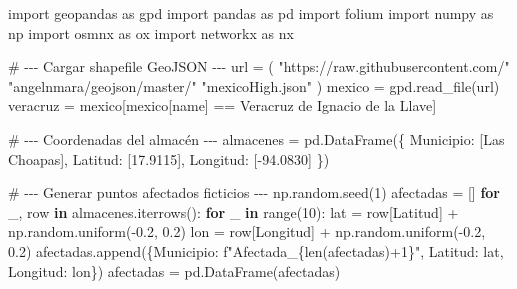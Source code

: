 \documentclass[
  spanish,
  us-letterpaper,
  DIV=11,
  numbers=noendperiod]{scrreprt}
\newenvironment{Shaded}{\begin{snugshade}}{\end{snugshade}}
\newcommand{\BuiltInTok}[1]{\textcolor[rgb]{0.00,0.23,0.31}{#1}}
\newcommand{\CommentTok}[1]{\textcolor[rgb]{0.37,0.37,0.37}{#1}}
\newcommand{\ControlFlowTok}[1]{\textcolor[rgb]{0.00,0.23,0.31}{\textbf{#1}}}
\newcommand{\DecValTok}[1]{\textcolor[rgb]{0.68,0.00,0.00}{#1}}
\newcommand{\FloatTok}[1]{\textcolor[rgb]{0.68,0.00,0.00}{#1}}
\newcommand{\ImportTok}[1]{\textcolor[rgb]{0.00,0.46,0.62}{#1}}
\newcommand{\KeywordTok}[1]{\textcolor[rgb]{0.00,0.23,0.31}{\textbf{#1}}}
\newcommand{\NormalTok}[1]{\textcolor[rgb]{0.00,0.23,0.31}{#1}}
\newcommand{\OperatorTok}[1]{\textcolor[rgb]{0.37,0.37,0.37}{#1}}
\newcommand{\SpecialCharTok}[1]{\textcolor[rgb]{0.37,0.37,0.37}{#1}}
\newcommand{\SpecialStringTok}[1]{\textcolor[rgb]{0.13,0.47,0.30}{#1}}
\newcommand{\StringTok}[1]{\textcolor[rgb]{0.13,0.47,0.30}{#1}}
\numberwithin{equation}{section}
\begin{document}
\begin{Shaded}
\begin{Highlighting}[]
\ImportTok{import}\NormalTok{ geopandas }\ImportTok{as}\NormalTok{ gpd}
\ImportTok{import}\NormalTok{ pandas }\ImportTok{as}\NormalTok{ pd}
\ImportTok{import}\NormalTok{ folium}
\ImportTok{import}\NormalTok{ numpy }\ImportTok{as}\NormalTok{ np}
\ImportTok{import}\NormalTok{ osmnx }\ImportTok{as}\NormalTok{ ox}
\ImportTok{import}\NormalTok{ networkx }\ImportTok{as}\NormalTok{ nx}

\CommentTok{\# {-}{-}{-} Cargar shapefile GeoJSON {-}{-}{-}}
\NormalTok{url }\OperatorTok{=}\NormalTok{ (}
    \StringTok{"https://raw.githubusercontent.com/"}
    \StringTok{"angelnmara/geojson/master/"}
    \StringTok{"mexicoHigh.json"}
\NormalTok{)}
\NormalTok{mexico }\OperatorTok{=}\NormalTok{ gpd.read\_file(url)}
\NormalTok{veracruz }\OperatorTok{=}\NormalTok{ mexico[mexico[}\StringTok{\textquotesingle{}name\textquotesingle{}}\NormalTok{] }\OperatorTok{==} \StringTok{\textquotesingle{}Veracruz de Ignacio de la Llave\textquotesingle{}}\NormalTok{]}

\CommentTok{\# {-}{-}{-} Coordenadas del almacén {-}{-}{-}}
\NormalTok{almacenes }\OperatorTok{=}\NormalTok{ pd.DataFrame(\{}
    \StringTok{\textquotesingle{}Municipio\textquotesingle{}}\NormalTok{: [}\StringTok{\textquotesingle{}Las Choapas\textquotesingle{}}\NormalTok{],}
    \StringTok{\textquotesingle{}Latitud\textquotesingle{}}\NormalTok{: [}\FloatTok{17.9115}\NormalTok{],}
    \StringTok{\textquotesingle{}Longitud\textquotesingle{}}\NormalTok{: [}\OperatorTok{{-}}\FloatTok{94.0830}\NormalTok{]}
\NormalTok{\})}

\CommentTok{\# {-}{-}{-} Generar puntos afectados ficticios {-}{-}{-}}
\NormalTok{np.random.seed(}\DecValTok{1}\NormalTok{)}
\NormalTok{afectadas }\OperatorTok{=}\NormalTok{ []}
\ControlFlowTok{for}\NormalTok{ \_, row }\KeywordTok{in}\NormalTok{ almacenes.iterrows():}
    \ControlFlowTok{for}\NormalTok{ \_ }\KeywordTok{in} \BuiltInTok{range}\NormalTok{(}\DecValTok{10}\NormalTok{):}
\NormalTok{        lat }\OperatorTok{=}\NormalTok{ row[}\StringTok{\textquotesingle{}Latitud\textquotesingle{}}\NormalTok{] }\OperatorTok{+}\NormalTok{ np.random.uniform(}\OperatorTok{{-}}\FloatTok{0.2}\NormalTok{, }\FloatTok{0.2}\NormalTok{)}
\NormalTok{        lon }\OperatorTok{=}\NormalTok{ row[}\StringTok{\textquotesingle{}Longitud\textquotesingle{}}\NormalTok{] }\OperatorTok{+}\NormalTok{ np.random.uniform(}\OperatorTok{{-}}\FloatTok{0.2}\NormalTok{, }\FloatTok{0.2}\NormalTok{)}
\NormalTok{        afectadas.append(\{}\StringTok{\textquotesingle{}Municipio\textquotesingle{}}\NormalTok{: }\SpecialStringTok{f"Afectada\_}\SpecialCharTok{\{}\BuiltInTok{len}\NormalTok{(afectadas)}\OperatorTok{+}\DecValTok{1}\SpecialCharTok{\}}\SpecialStringTok{"}\NormalTok{,}
         \StringTok{\textquotesingle{}Latitud\textquotesingle{}}\NormalTok{: lat, }\StringTok{\textquotesingle{}Longitud\textquotesingle{}}\NormalTok{: lon\})}
\NormalTok{afectadas }\OperatorTok{=}\NormalTok{ pd.DataFrame(afectadas)}


\end{Highlighting}
\end{Shaded}
\end{document}
